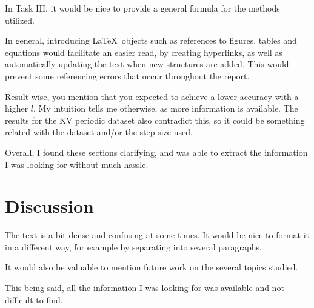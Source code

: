 \documentclass[10pt]{article}
\begin{document}
In Task III, it would be nice to provide a general formula for the methods utilized.

In general, introducing \LaTeX\ objects such as references to figures, tables and equations would facilitate an easier read, by creating hyperlinks, as well as automatically updating the text when new structures are added. This would prevent some referencing errors that occur throughout the report.

Result wise, you mention that you expected to achieve a lower accuracy with a higher $l$. My intuition tells me otherwise, as more information is available. The results for the KV periodic dataset also contradict this, so it could be something related with the dataset and/or the step size used.

Overall, I found these sections clarifying, and was able to extract the information I was looking for without much hassle.

\section{Discussion}

The text is a bit dense and confusing at some times. It would be nice to format it in a different way, for example by separating into several paragraphs.

It would also be valuable to mention future work on the several topics studied.

This being said, all the information I was looking for was available and not difficult to find.
\end{document}
